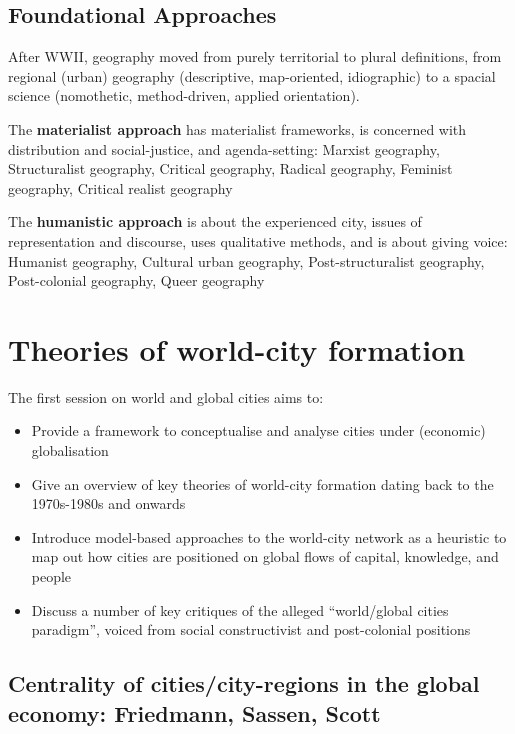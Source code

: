\documentclass{article}
\begin{document}
\subsection{Foundational Approaches}

After WWII, geography moved from purely territorial to plural definitions, from regional (urban) geography (descriptive, map-oriented, idiographic) to a spacial science (nomothetic, method-driven, applied orientation).

The \textbf{materialist approach} has materialist frameworks, is concerned with distribution and social-justice, and agenda-setting: Marxist geography, Structuralist geography, Critical geography, Radical geography, Feminist geography, Critical realist geography

The \textbf{humanistic approach} is about the experienced city, issues of representation and discourse, uses qualitative methods, and is about giving voice: Humanist geography, Cultural urban geography, Post-structuralist geography, Post-colonial geography, Queer geography


\pagebreak\section{Theories of world-city formation}
\date{Octobre 4th, 2021}

The first session on world and global cities aims to:
\begin{itemize}
  \item Provide a framework to conceptualise and analyse cities under (economic) globalisation
  \item Give an overview of key theories of world-city formation dating back to the 1970s-1980s and onwards
  \item Introduce model-based approaches to the world-city network as a heuristic to map out how cities are positioned on global flows of capital, knowledge, and people
  \item Discuss a number of key critiques of the alleged ``world/global cities paradigm'', voiced from social constructivist and post-colonial positions
\end{itemize}

\subsection{Centrality of cities/city-regions in the global economy: Friedmann, Sassen, Scott}
\end{document}
